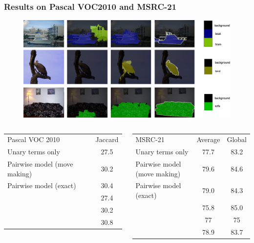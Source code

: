 \documentclass[final,ignorenonframetext,compress]{beamer}
\begin{document}
\begin{frame}
    \frametitle{Results on Pascal VOC2010 and MSRC-21}
    \begin{figure}
        \centering
        \includegraphics[width=.8\linewidth]{images/results_pascal}
    \end{figure}
    \vspace{-10mm}
    \tiny
    \begin{columns}[t]
        \begin{table}
                \begin{tabular}{lc}
                    \toprule
                    Pascal VOC 2010& Jaccard \\
                    \cmidrule{1-2}
                    Unary terms only &  27.5 \\
                    Pairwise model (move making)& 30.2\\
                    Pairwise model (exact) & 30.4\\
                    \cmidrule{1-2}
                    \textcite{dann2012pottics} & 27.4\\
                    \textcite{krahenbuhl2012efficient} & 30.2\\
                    \textcite{krahenbuhlparameter} & 30.8\\
                    \bottomrule
                \end{tabular}
        \end{table}
        \begin{table}
                \begin{tabular}{lcc}
                    \toprule
                    MSRC-21 & Average & Global \\
                    \cmidrule{1-3}
                    Unary terms only & 77.7& 83.2 \\
                    Pairwise model (move making)& 79.6&84.6\\
                    Pairwise model (exact)& 79.0 & 84.3\\
                    \cmidrule{1-3}
                    \textcite{ladicky2009associative} & 75.8& 85.0\\
                    \textcite{gonfaus2010harmony} & 77&  75\\
                    \textcite{lucchi2013learning} & 78.9& 83.7\\
                    \bottomrule
                \end{tabular}

        \end{table}
    \end{columns}
\end{frame}
\end{document}
